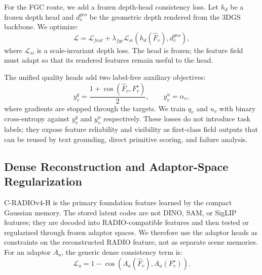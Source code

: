 \documentclass[journal,twoside]{IEEEtran}
\newcommand{\radio}{C-RADIOv4-H}
\begin{document}
For the FGC route, we add a frozen depth-head consistency loss. Let $h_d$ be a
frozen depth head and $d_v^{geo}$ be the geometric depth rendered from the 3DGS
backbone. We optimize:
\begin{equation}
  \mathcal{L}
  =
  \mathcal{L}_{feat}
  + \lambda_{fgc}\mathcal{L}_{si}(h_d(\hat{F}_v), d_v^{geo}),
\end{equation}
where $\mathcal{L}_{si}$ is a scale-invariant depth loss. The head is frozen; the
feature field must adapt so that its rendered features remain useful to the
head.

The unified quality heads add two label-free auxiliary objectives:
\begin{equation}
  y^q_v = \frac{1+\cos(\hat{F}_v,F_v^\star)}{2}, \qquad
  y^u_v = \alpha_v,
\end{equation}
where gradients are stopped through the targets. We train $q_v$ and $u_v$ with
binary cross-entropy against $y^q_v$ and $y^u_v$ respectively. These losses do
not introduce task labels; they expose feature reliability and visibility as
first-class field outputs that can be reused by text grounding, direct
primitive scoring, and failure analysis.

\subsection{Dense Reconstruction and Adaptor-Space Regularization}

\radio{} is the primary foundation feature learned by the compact Gaussian
memory. The stored latent codes are not DINO, SAM, or SigLIP features; they are
decoded into RADIO-compatible features and then tested or regularized through
frozen adaptor spaces. We therefore use the adaptor heads as constraints on the
reconstructed RADIO feature, not as separate scene memories. For an adaptor
$A_a$, the generic dense consistency term is:
\begin{equation}
  \mathcal{L}_{a}
  =
  1 - \cos(A_a(\hat{F}_v), A_a(F_v^{\star})).
\end{equation}
\end{document}
